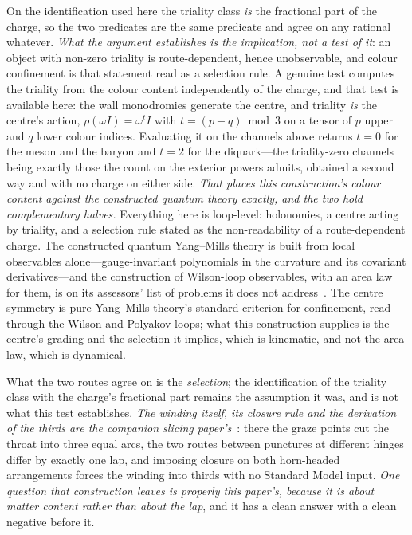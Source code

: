 \documentclass[11pt]{article}
\begin{document}
On the identification used here the triality class \emph{is} the fractional part of the charge, so the two predicates are the same predicate and agree on any rational whatever. \emph{What the argument establishes is the implication, not a test of it}: an object with non-zero triality is route-dependent, hence unobservable, and colour confinement is that statement read as a selection rule. A genuine test computes the triality from the colour content independently of the charge, and that test is available here: the wall monodromies generate the centre, and triality \emph{is} the centre's action, $\rho(\omega I)=\omega^{t}I$ with $t=(p-q)\bmod 3$ on a tensor of $p$ upper and $q$ lower colour indices. Evaluating it on the channels above returns $t=0$ for the meson and the baryon and $t=2$ for the diquark---the triality-zero channels being exactly those the count on the exterior powers admits, obtained a second way and with no charge on either side. \emph{That places this construction's colour content against the constructed quantum theory exactly, and the two hold complementary halves.} Everything here is loop-level: holonomies, a centre acting by triality, and a selection rule stated as the non-readability of a route-dependent charge. The constructed quantum Yang--Mills theory is built from local observables alone---gauge-invariant polynomials in the curvature and its covariant derivatives---and the construction of Wilson-loop observables, with an area law for them, is on its assessors' list of problems it does not address~\cite{YMGroup2026}. The centre symmetry is pure Yang--Mills theory's standard criterion for confinement, read through the Wilson and Polyakov loops; what this construction supplies is the centre's grading and the selection it implies, which is kinematic, and not the area law, which is dynamical.

What the two routes agree on is the \emph{selection}; the identification of the triality class with the charge's fractional part remains the assumption it was, and is not what this test establishes. \emph{The winding itself, its closure rule and the derivation of the thirds are the companion slicing paper's}~\cite{JanzenSlicing}: there the graze points cut the throat into three equal arcs, the two routes between punctures at different hinges differ by exactly one lap, and imposing closure on both horn-headed arrangements forces the winding into thirds with no Standard Model input. \emph{One question that construction leaves is properly this paper's, because it is about matter content rather than about the lap}, and it has a clean answer with a clean negative before it. 
\end{document}
